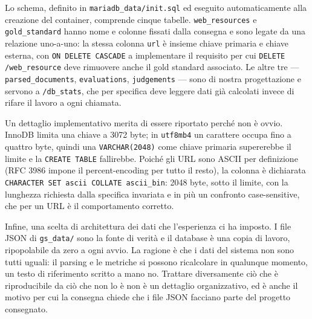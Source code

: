 \documentclass[10pt,a4paper,twocolumn]{article}
\begin{document}
Lo schema, definito in \texttt{mariadb\_data/init.sql} ed eseguito
automaticamente alla creazione del container, comprende cinque tabelle.
\texttt{web\_resources} e \texttt{gold\_standard} hanno nome e colonne fissati
dalla consegna e sono legate da una relazione uno-a-uno: la stessa colonna
\texttt{url} è insieme chiave primaria e chiave esterna, con
\texttt{ON DELETE CASCADE} a implementare il requisito per cui
\texttt{DELETE /web\_resource} deve rimuovere anche il gold standard
associato. Le altre tre --- \texttt{parsed\_documents}, \texttt{evaluations},
\texttt{judgements} --- sono di nostra progettazione e servono a
\texttt{/db\_stats}, che per specifica deve leggere dati già calcolati invece
di rifare il lavoro a ogni chiamata.

Un dettaglio implementativo merita di essere riportato perché non è ovvio.
InnoDB limita una chiave a 3072 byte; in \texttt{utf8mb4} un carattere occupa
fino a quattro byte, quindi una \texttt{VARCHAR(2048)} come chiave primaria
supererebbe il limite e la \texttt{CREATE TABLE} fallirebbe. Poiché gli URL
sono ASCII per definizione (RFC 3986 impone il percent-encoding per tutto il
resto), la colonna è dichiarata \texttt{CHARACTER SET ascii COLLATE ascii\_bin}:
2048 byte, sotto il limite, con la lunghezza richiesta dalla specifica
invariata e in più un confronto case-sensitive, che per un URL è il
comportamento corretto.

Infine, una scelta di architettura dei dati che l'esperienza ci ha imposto. I
file JSON di \texttt{gs\_data/} sono la fonte di verità e il database è una
copia di lavoro, ripopolabile da zero a ogni avvio. La ragione è che i dati del
sistema non sono tutti uguali: il parsing e le metriche si possono ricalcolare
in qualunque momento, un testo di riferimento scritto a mano no. Trattare
diversamente ciò che è riproducibile da ciò che non lo è non è un dettaglio
organizzativo, ed è anche il motivo per cui la consegna chiede che i file JSON
facciano parte del progetto consegnato.
\end{document}
